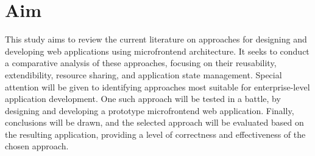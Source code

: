 \section{Aim}
This study aims to review the current literature on approaches for designing and developing web applications using microfrontend architecture. It seeks to conduct a comparative analysis of these approaches, focusing on their reusability, extendibility, resource sharing, and application state management. Special attention will be given to identifying approaches most suitable for enterprise-level application development. One such approach will be tested in a battle, by designing and developing a prototype microfrontend web application. Finally, conclusions will be drawn, and the selected approach will be evaluated based on the resulting application, providing a level of correctness and effectiveness of the chosen approach.